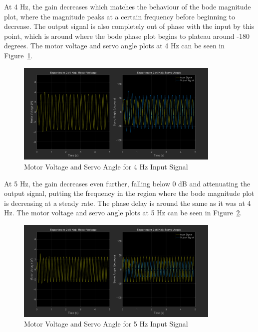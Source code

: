 \documentclass[12pt]{article}
\begin{document}
At 4 Hz, the gain decreases which matches the behaviour of the bode magnitude plot, where the magnitude peaks at a certain frequency before beginning to decrease. The output signal is also completely out of phase with the input by this point, which is around where the bode phase plot begins to plateau around -180 degrees. The motor voltage and servo angle plots at 4 Hz can be seen in Figure~\ref{fig:exp2_4}.
\begin{figure}[h!]
    \centering
    \includegraphics[width=0.87\textwidth]{exp2_4}
    \caption{\label{fig:exp2_4}Motor Voltage and Servo Angle for 4 Hz Input Signal}
\end{figure}

At 5 Hz, the gain decreases even further, falling below 0 dB and attenuating the output signal, putting the frequency in the region where the bode magnitude plot is decreasing at a steady rate. The phase delay is around the same as it was at 4 Hz. The motor voltage and servo angle plots at 5 Hz can be seen in Figure~\ref{fig:exp2_5}.
\begin{figure}[h!]
    \centering
    \includegraphics[width=0.87\textwidth]{exp2_5}
    \caption{\label{fig:exp2_5}Motor Voltage and Servo Angle for 5 Hz Input Signal}
\end{figure}
\end{document}
